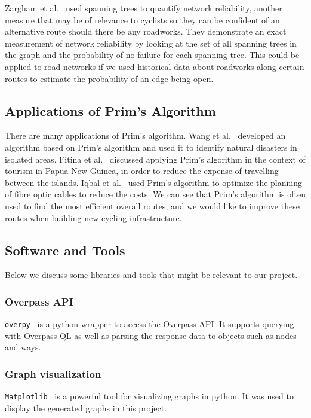 \documentclass[12pt,a4paper]{report}
\begin{document}
Zargham et al.~\cite{zarghami2020} used spanning trees to quantify network reliability, another measure that may be of relevance to cyclists so they can be confident of an alternative route should there be any roadworks. They demonstrate an exact measurement of network reliability by looking at the set of all spanning trees in the graph and the probability of no failure for each spanning tree. This could be applied to road networks if we used historical data about roadworks along certain routes to estimate the probability of an edge being open.

\subsection{Applications of Prim's Algorithm}
There are many applications of Prim's algorithm. Wang et al.~\cite{wang2018} developed an algorithm based on Prim's algorithm and used it to identify natural disasters in isolated areas. Fitina et al.~\cite{fitina} discussed applying Prim's algorithm in the context of tourism in Papua New Guinea, in order to reduce the expense of travelling between the islands. Iqbal et al.~\cite{iqbal2017} used Prim's algorithm to optimize the planning of fibre optic cables to reduce the costs. We can see that Prim's algorithm is often used to find the most efficient overall routes, and we would like to improve these routes when building new cycling infrastructure. 

\subsection{Software and Tools}
Below we discuss some libraries and tools that might be relevant to our project.

\subsubsection*{Overpass API}
\texttt{overpy}~\cite{overpy} is a python wrapper to access the Overpass API. It supports querying with Overpass QL as well as parsing the response data to objects such as nodes and ways. 

\subsubsection*{Graph visualization}
\texttt{Matplotlib}~\cite{Hunter:2007} is a powerful tool for visualizing graphs in python. It was used to display the generated graphs in this project.
\end{document}
